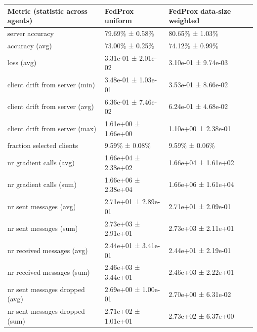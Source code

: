 \begin{tabular}{lll}
\hline
 Metric (statistic across agents)   & FedProx uniform     & FedProx data-size weighted   \\
\hline
 server accuracy                    & 79.69\% ± 0.58\%      & 80.65\% ± 1.03\%               \\
 accuracy (avg)                     & 73.00\% ± 0.25\%      & 74.12\% ± 0.99\%               \\
 loss (avg)                         & 3.31e-01 ± 2.01e-02 & 3.10e-01 ± 9.74e-03          \\
 client drift from server (min)     & 3.48e-01 ± 1.03e-01 & 3.53e-01 ± 8.66e-02          \\
 client drift from server (avg)     & 6.36e-01 ± 7.46e-02 & 6.24e-01 ± 4.68e-02          \\
 client drift from server (max)     & 1.61e+00 ± 1.66e+00 & 1.10e+00 ± 2.38e-01          \\
 fraction selected clients          & 9.59\% ± 0.08\%       & 9.59\% ± 0.06\%                \\
 nr gradient calls (avg)            & 1.66e+04 ± 2.38e+02 & 1.66e+04 ± 1.61e+02          \\
 nr gradient calls (sum)            & 1.66e+06 ± 2.38e+04 & 1.66e+06 ± 1.61e+04          \\
 nr sent messages (avg)             & 2.71e+01 ± 2.89e-01 & 2.71e+01 ± 2.09e-01          \\
 nr sent messages (sum)             & 2.73e+03 ± 2.91e+01 & 2.73e+03 ± 2.11e+01          \\
 nr received messages (avg)         & 2.44e+01 ± 3.41e-01 & 2.44e+01 ± 2.19e-01          \\
 nr received messages (sum)         & 2.46e+03 ± 3.44e+01 & 2.46e+03 ± 2.22e+01          \\
 nr sent messages dropped (avg)     & 2.69e+00 ± 1.00e-01 & 2.70e+00 ± 6.31e-02          \\
 nr sent messages dropped (sum)     & 2.71e+02 ± 1.01e+01 & 2.73e+02 ± 6.37e+00          \\
\hline
\end{tabular}